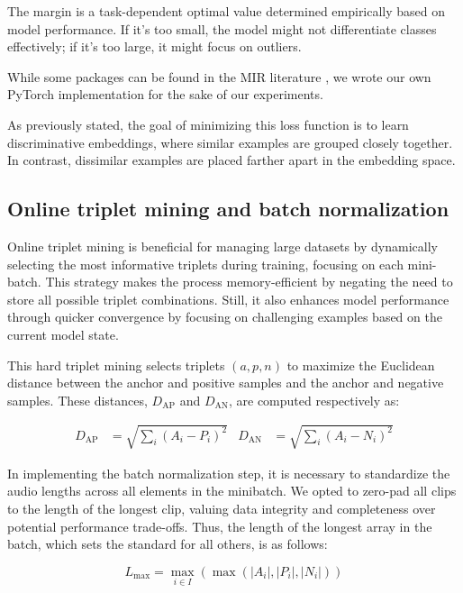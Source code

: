 The margin is a task-dependent optimal value determined empirically based on model performance. If it's too small, the model might not differentiate classes effectively; if it's too large, it might focus on outliers.

While some packages can be found in the MIR literature \cite{auraloss}, we wrote our own PyTorch \cite{Paszke2019PyTorch:Library} implementation for the sake of our experiments.

As previously stated, the goal of minimizing this loss function is to learn discriminative embeddings, where similar examples are grouped closely together. In contrast, dissimilar examples are placed farther apart in the embedding space.

\subsection{Online triplet mining and batch normalization}

Online triplet mining is beneficial for managing large datasets by dynamically selecting the most informative triplets during training, focusing on each mini-batch. This strategy makes the process memory-efficient by negating the need to store all possible triplet combinations. Still, it also enhances model performance through quicker convergence by focusing on challenging examples based on the current model state.

This hard triplet mining selects triplets $(a, p, n)$ to maximize the Euclidean distance between the anchor and positive samples and the anchor and negative samples. These distances, $D_{\text{AP}}$ and $D_{\text{AN}}$, are computed respectively as:


\begin{align}
D_{\text{AP}} &= \sqrt{\sum_{i} (A_i - P_i)^2} & D_{\text{AN}} &= \sqrt{\sum_{i} (A_i - N_i)^2}
\end{align}


In implementing the batch normalization step, it is necessary to standardize the audio lengths across all elements in the minibatch. We opted to zero-pad all clips to the length of the longest clip, valuing data integrity and completeness over potential performance trade-offs. Thus, the length of the longest array in the batch, which sets the standard for all others, is as follows:

\begin{equation}
L_{\text{max}} = \max_{i \in I} \left( \max \left( |A_i|, |P_i|, |N_i| \right) \right)
\end{equation}

